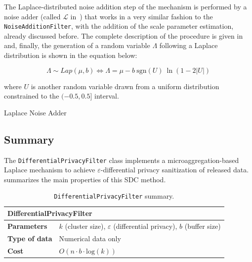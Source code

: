 The Laplace-distributed noise addition step of the mechanism is performed by a noise adder (called $\mathcal{L}$ in~) that works in a very similar fashion to the \texttt{NoiseAdditionFilter}, with the addition of the scale parameter estimation, already discussed before. The complete description of the procedure is given in~ and, finally, the generation of a random variable $\Lambda$ following a Laplace distribution is shown in the equation below:

\begin{equation}
\Lambda \sim Lap(\mu,b) \iff \Lambda = \mu - b~\mathrm{sgn}(U)~\ln(1-2\vert U \vert)
\end{equation}

where $U$ is another random variable drawn from a uniform distribution constrained to the $(-0.5,0.5]$ interval.

\begin{algorithm}
\caption{Laplace Noise Adder\label{al:laplace-noise-adder}}
\end{algorithm}

\subsection{Summary}
\label{Implementation:DifferentialPrivacy:Summary}

The \texttt{DifferentialPrivacyFilter} class implements a microaggregation-based Laplace mechanism to achieve $\varepsilon$-differential privacy sanitization of released data.~ summarizes the main properties of this SDC method.

\begin{table}[h]
	\centering
	\begin{tabular}{@{}ll@{}}
	\toprule
	\multicolumn{2}{l}{\textbf{DifferentialPrivacyFilter}}                             \\ \midrule
	\textbf{Parameters}   & $k$ (cluster size), $\varepsilon$ (differential privacy), $b$ (buffer size) \\
	\textbf{Type of data} & Numerical data only \\
	\textbf{Cost}         & $O(n \cdot b \cdot \mathrm{log}(k))$  \\ \bottomrule
	\end{tabular}
	\caption{\texttt{DifferentialPrivacyFilter} summary.}
	\label{table:differential-privacy-summary}
\end{table}